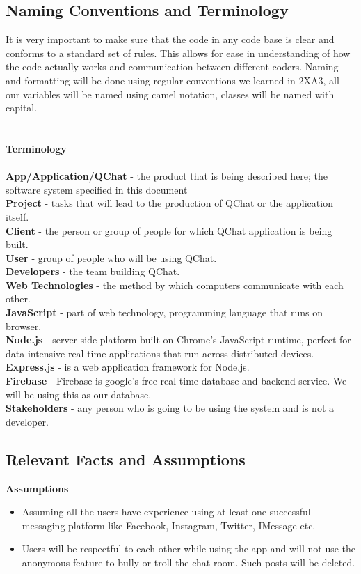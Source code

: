 \documentclass[12pt, titlepage]{article}
\begin{document}
\subsection{Naming Conventions and Terminology}


It is very important to make sure that the code in any code base is clear and conforms to a standard set of rules. This allows for ease in understanding of how the code actually works and communication between different coders. Naming and formatting will be done using regular conventions we learned in 2XA3, all our variables will be named using camel notation, classes will be named with capital.
\\
\\
\\
\textbf{Terminology} \\
\\
\textbf{App/Application/QChat} - the product that is being described here; the software system specified in this document \\
\textbf{Project} - tasks that will lead to the production of QChat or the application itself. \\
\textbf{Client} - the person or group of people for which QChat application is being built. \\
\textbf{User} - group of people who will be using QChat. \\
\textbf{Developers} - the team building QChat. \\
\textbf{Web Technologies} - the method by which computers communicate with each other. \\
\textbf{JavaScript} - part of web technology, programming language that runs on browser. \\
\textbf{Node.js} - server side platform built on Chrome’s JavaScript runtime, perfect for data intensive real-time applications that run across distributed devices. \\
\textbf{Express.js} - is a web application framework for Node.js. \\
\textbf{Firebase} - Firebase is google’s free real time database and backend service. We will be using this as our database. \\
\textbf{Stakeholders} - any person who is going to be using the system and is not a developer.\\

\subsection{Relevant Facts and Assumptions}
\textbf{Assumptions}
\begin{itemize}
    \item Assuming all the users have experience using at least one successful messaging platform like Facebook, Instagram, Twitter, IMessage etc.
    \item Users will be respectful to each other while using the app and will not use the anonymous feature to bully or troll the chat room. Such posts will be deleted.
\end{itemize}
\end{document}
